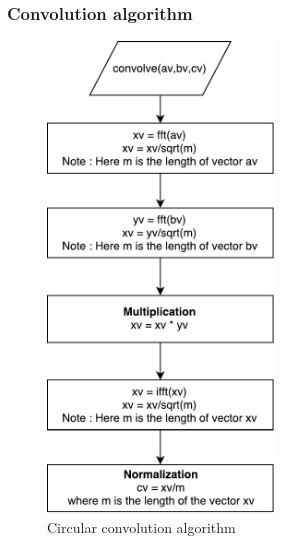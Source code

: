\begin{refsection}
\subsubsection{Convolution algorithm}
\begin{figure}[h]
	\centering
	\includegraphics[width=6cm]{./algorithms/fft/figures/convolution.pdf}
	\caption{Circular convolution algorithm}\label{convolution}
\end{figure}





\newpage

\end{refsection}
